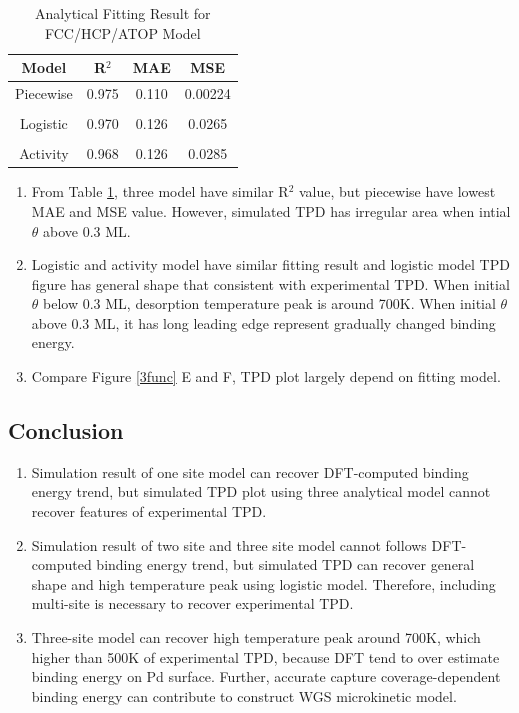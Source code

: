 \documentclass[11pt]{article}
\begin{document}
\begin{table} [h]
\caption{Analytical Fitting Result for FCC/HCP/ATOP Model }
\centering
\begin{tabular} {c c c c}
\toprule
Model & R$^2$&MAE&MSE\\
\midrule
Piecewise     &0.975 &0.110&0.00224 \\
\\
Logistic  & 0.970 &0.126&0.0265\\
\\
Activity  & 0.968 &0.126&0.0285 \\
\bottomrule
\end{tabular}
\label{3sitefit}
\end{table}

\begin{enumerate}
\item From Table \ref{3sitefit}, three model have similar R$^2$ value, but piecewise have lowest MAE and MSE value. However, simulated TPD has irregular area when intial $\theta$ above 0.3 ML.
\item Logistic and activity model have similar fitting result and logistic model TPD figure has general shape that consistent with experimental TPD. When initial $\theta$ below 0.3 ML, desorption temperature peak is around 700K. When initial $\theta$ above 0.3 ML, it has long leading edge represent gradually changed binding energy.
\item  Compare Figure \ref{3func} E and F, TPD plot largely depend on fitting model. 
\end{enumerate}

\clearpage

\subsection*{Conclusion}
\begin{enumerate}
\item Simulation result of one site model can recover DFT-computed binding energy trend, but simulated TPD plot using three analytical model cannot recover features of experimental TPD.
\item Simulation result of two site and three site model cannot follows DFT-computed binding energy trend, but simulated TPD can recover general shape and high temperature peak using logistic model. Therefore, including multi-site is necessary to recover experimental TPD.
\item Three-site model can recover high temperature peak around 700K, which higher than 500K  of experimental TPD, because DFT tend to over estimate binding energy on Pd surface. Further, accurate capture coverage-dependent binding energy can contribute to construct WGS microkinetic model.
\end{enumerate}
\end{document}
